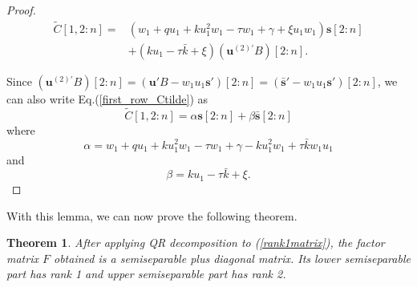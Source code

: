 \documentclass{article}
\newtheorem{theorem}{Theorem}
\begin{document}
\begin{proof}
\begin{equation}
\begin{aligned}
    \tilde{C}[1,2:n]=&(w_1+qu_1+ku_1^2w_1-\tau w_1+\gamma +\xi u_1w_1) \mathbf{s}[2:n]\\&+(ku_1-\tau \bar{k}+\xi)(\mathbf{u}^{(2)'}B)[2:n].\label{first_row_Ctilde}
\end{aligned}
\end{equation}

Since $(\mathbf{u}^{(2)'}B)[2:n]=(\mathbf{u}'B-w_1u_1\mathbf{s}')[2:n]=(\bar{\mathbf{s}}'-w_1u_1\mathbf{s}')[2:n]$, we can also write Eq.(\ref{first_row_Ctilde}) as
\begin{equation}
    \tilde{C}[1,2:n]=\alpha \mathbf{s}[2:n]+\beta\bar{\mathbf{s}}[2:n]
\end{equation}
where
\begin{equation}
    \alpha=w_1+qu_1+ku_1^2w_1-\tau w_1+\gamma - ku_1^2w_1+\tau \bar{k}w_1u_1
\end{equation}
and
\begin{equation}
    \beta=ku_1-\tau \bar{k}+\xi.
\end{equation}

\end{proof}


With this lemma, we can now prove the following theorem.


\begin{theorem}
After applying QR decomposition to (\ref{rank1matrix}), the factor matrix $F$ obtained is a semiseparable plus diagonal matrix. Its lower semiseparable part has rank 1 and upper semiseparable part has rank 2. 
\end{theorem}
\end{document}
